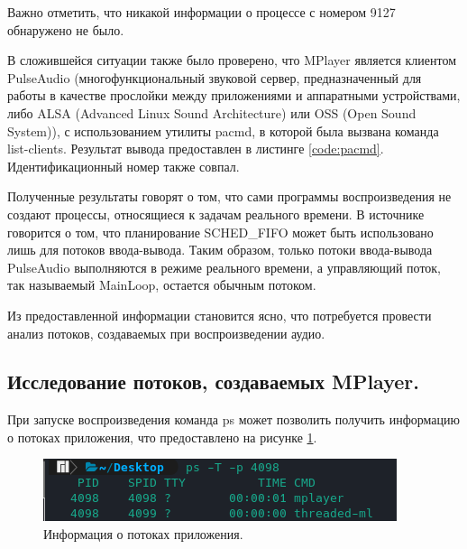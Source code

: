 Важно отметить, что никакой информации о процессе с номером 9127 обнаружено не было.

В сложившейся ситуации также было проверено, что MPlayer является клиентом PulseAudio (многофункциональный звуковой сервер, предназначенный для работы в качестве прослойки между приложениями и аппаратными устройствами, либо ALSA (Advanced Linux Sound Architecture) или OSS (Open Sound System)), с использованием утилиты pacmd, в которой была вызвана команда list-clients. Результат вывода предоставлен в листинге \ref{code:pacmd}. Идентификационный номер также совпал.


Полученные результаты говорят о том, что сами программы воспроизведения не создают процессы, относящиеся к задачам реального времени. В источнике \cite{hackerNews} говорится о том, что планирование SCHED\_FIFO может быть использовано лишь для потоков ввода-вывода. Таким образом, только потоки ввода-вывода PulseAudio выполняются в режиме реального времени, а управляющий поток, так называемый MainLoop, остается обычным потоком.

Из предоставленной информации становится ясно, что потребуется провести анализ потоков, создаваемых при воспроизведении аудио.

\subsection{Исследование потоков, создаваемых MPlayer. }
При запуске воспроизведения команда ps может позволить получить информацию о потоках приложения, что предоставлено на рисунке \ref{fig:psThreads}.

\begin{figure}[H]
	\centering
	\includegraphics[scale=0.8]{img/psThreads.png}
	\caption{Информация о потоках приложения. }
	\label{fig:psThreads}
\end{figure}

